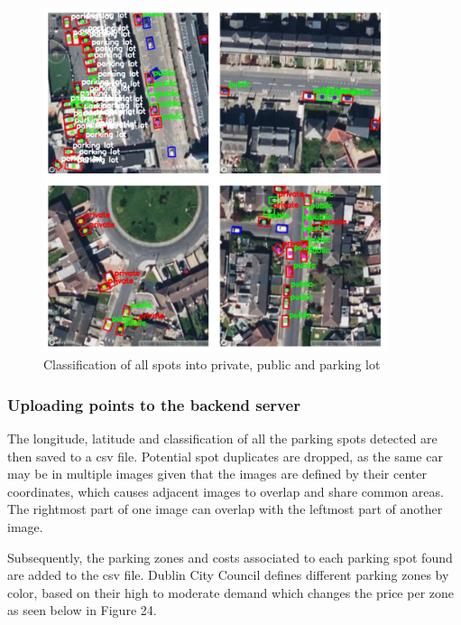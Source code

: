 \begin{figure}[htbp]
  \centering
  \includegraphics[width=0.9\textwidth]{images/classification-cars.png}
  \caption{Classification of all spots into private, public and parking lot}
  \label{fig:classification_all_spots}
\end{figure}

\newpage{}

\subsubsection{Uploading points to the backend server}
The longitude, latitude and classification of all the parking spots detected are
then saved to a csv file. Potential spot duplicates are dropped, as the same car
may be in multiple images given that the images are defined by their center
coordinates, which causes adjacent images to overlap and share common areas. The
rightmost part of one image can overlap with the leftmost part of another image.

Subsequently, the parking zones and costs associated to each parking spot found
are added to the csv file. Dublin City Council defines different parking zones
by color, based on their high to moderate demand which changes the price per
zone as seen below in Figure 24.

